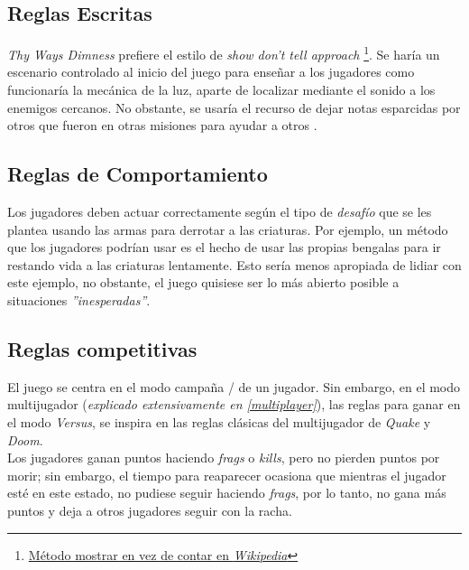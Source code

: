 \begin{multicols}{2}
    \subsection{Reglas Escritas} \label{reglasEscritas}
    \textit{Thy Ways Dimness} prefiere el estilo de \textit{show don't tell approach}\cite{showdonttell2025} \footnote{\href{https://en.wikipedia.org/wiki/Show,_don\%27t_tell}{Método mostrar en vez de contar en \textit{Wikipedia}}}. Se haría un escenario controlado al inicio del juego para enseñar a los jugadores como funcionaría la mecánica de la luz, aparte de localizar mediante el sonido a los enemigos cercanos.
    No obstante, se usaría el recurso de dejar notas esparcidas por otros \hunters que fueron en otras misiones para ayudar a otros \hunters.
    \subsection{Reglas de Comportamiento}
    Los jugadores deben actuar correctamente según el tipo de \textit{desafío} que se les plantea usando las armas para derrotar a las criaturas. Por ejemplo, un método que los jugadores podrían usar es el hecho de usar las propias bengalas para ir restando vida a las criaturas lentamente. Esto sería menos apropiada de lidiar con este ejemplo, no obstante, el juego quisiese ser lo más abierto posible a situaciones \textit{''inesperadas''}.
    \subsection{Reglas competitivas}
    El juego se centra en el modo campaña / de un jugador. Sin embargo, en el modo multijugador (\textit{explicado extensivamente en \ref{multiplayer}}), las reglas para ganar en el modo \textit{Versus}, se inspira en las reglas clásicas del multijugador de \textit{Quake} y \textit{Doom}.\\
    Los jugadores ganan puntos haciendo \textit{frags} o \textit{kills}, pero no pierden puntos por morir; sin embargo, el tiempo para reaparecer ocasiona que mientras el jugador esté en este estado, no pudiese seguir haciendo \textit{frags}, por lo tanto, no gana más puntos y deja a otros jugadores seguir con la racha.

\end{multicols}
